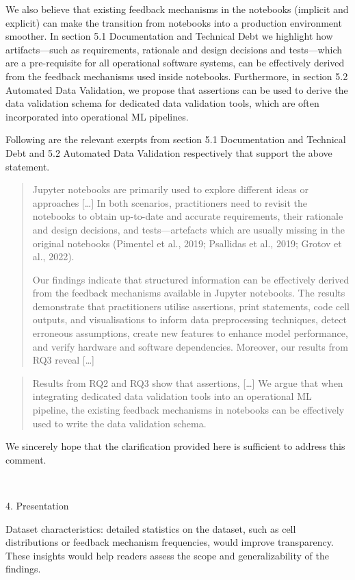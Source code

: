 \documentclass[11pt,fleqn]{article}
\newcommand{\eline}{\vspace*{.75\baselineskip}}
\newcommand{\Referee}[1]{\eline \noindent {\bf Reviewer comment #1:} \\}
\newenvironment{revcomment}[1][]
{\Referee{#1}\begin{rcomment}}
{\end{rcomment}}
\begin{document}
We also believe that existing feedback mechanisms in the notebooks (implicit and explicit) can make the transition from notebooks into a production environment smoother. In section 5.1 Documentation and Technical Debt we highlight how artifacts---such as requirements, rationale and design decisions and tests---which are a pre-requisite for all operational software systems, can be effectively derived from the feedback mechanisms used inside notebooks. Furthermore, in section 5.2 Automated Data Validation, we propose that assertions can be used to derive the data validation schema for dedicated data validation tools, which are often incorporated into operational ML pipelines.

Following are the relevant exerpts from section 5.1 Documentation and Technical Debt and 5.2 Automated Data Validation respectively that support the above statement.

\begin{quote}
  Jupyter notebooks are primarily used to explore different ideas or approaches [\ldots] In both scenarios, practitioners need to revisit the notebooks to obtain up-to-date and accurate requirements, their rationale and design decisions, and tests---artefacts which are usually missing in the original notebooks (Pimentel et al., 2019; Psallidas et al., 2019; Grotov et al., 2022).

  Our findings indicate that structured information can be effectively derived from the feedback mechanisms available in Jupyter notebooks. The results demonstrate that practitioners utilise assertions, print statements, code cell outputs, and visualisations to inform data preprocessing techniques, detect erroneous assumptions, create new features to enhance model performance, and verify hardware and software dependencies. Moreover, our results from RQ3 reveal [\ldots]
\end{quote}

\begin{quote}
  Results from RQ2 and RQ3 show that assertions, [\ldots] We argue that when integrating dedicated data validation tools into an operational ML pipeline, the existing feedback mechanisms in notebooks can be effectively used to write the data validation schema.
\end{quote}

We sincerely hope that the clarification provided here is sufficient to address this comment.

\begin{revcomment}[2.11]
  4. Presentation

  Dataset characteristics: detailed statistics on the dataset, such as cell distributions or feedback mechanism frequencies, would improve transparency. These insights would help readers assess the scope and generalizability of the findings.
\end{revcomment}
\end{document}
